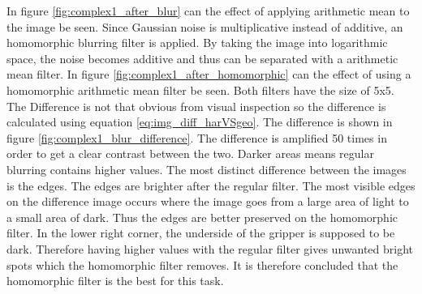In figure \ref{fig:complex1_after_blur} can the effect of applying arithmetic mean to the image be seen.
Since Gaussian noise is multiplicative instead of additive, an homomorphic blurring filter is applied.
By taking the image into logarithmic space, the noise becomes additive and thus can be separated with a arithmetic mean filter.
In figure \ref{fig:complex1_after_homomorphic} can the effect of using a homomorphic arithmetic mean filter be seen.
Both filters have the size of 5x5. The Difference is not that obvious from visual inspection so the difference is calculated using equation \ref{eq:img_diff_harVSgeo}.
The difference is shown in figure \ref{fig:complex1_blur_difference}.
The difference is amplified 50 times in order to get a clear contrast between the two.
Darker areas means regular blurring contains higher values.
The most distinct difference between the images is the edges. 
The edges are brighter after the regular filter. 
The most visible edges on the difference image occurs where the image goes from a large area of light to a small area of dark.
Thus the edges are better preserved on the homomorphic filter.
In the lower right corner, the underside of the gripper is supposed to be dark.
Therefore having higher values with the regular filter gives unwanted bright spots which the homomorphic filter removes.
It is therefore concluded that the homomorphic filter is the best for this task.




